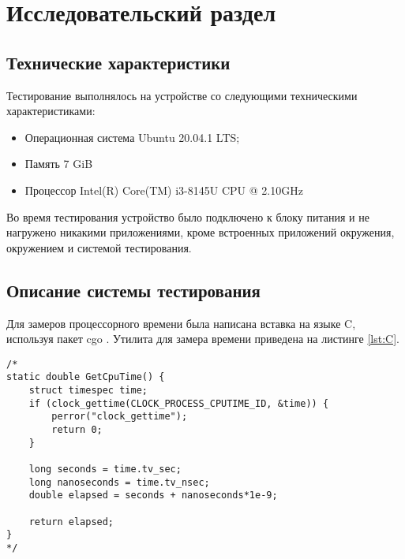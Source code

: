 \chapter{Исследовательский раздел}

\section{Технические характеристики}

Тестирование выполнялось на устройстве со следующими техническими характеристиками:
\begin{itemize}
	\item Операционная система Ubuntu 20.04.1 LTS;
	\item Память 7 GiB
	\item Процессор Intel(R) Core(TM) i3-8145U CPU @ 2.10GHz \cite{intel}
\end{itemize}
Во время тестирования устройство было подключено к блоку питания и не нагружено никакими приложениями, кроме встроенных приложений окружения, окружением и системой тестирования.

\section{Описание системы тестирования}

Для замеров процессорного времени была написана вставка на языке C, используя пакет cgo \cite{cgo}. Утилита для замера времени приведена на листинге \ref{lst:C}.

\captionsetup{singlelinecheck = false, justification=raggedright}
\begin{lstlisting}[label=lst:C,caption=Вставка на языке С для замера времени]
/*
static double GetCpuTime() {
	struct timespec time;
	if (clock_gettime(CLOCK_PROCESS_CPUTIME_ID, &time)) {
		perror("clock_gettime");
		return 0;
	}
	
	long seconds = time.tv_sec;
	long nanoseconds = time.tv_nsec;
	double elapsed = seconds + nanoseconds*1e-9;
	
	return elapsed;
}
*/
\end{lstlisting}

